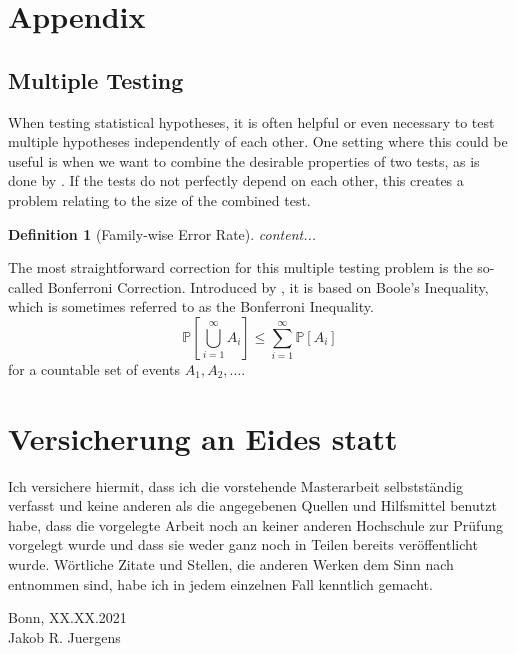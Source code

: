 \documentclass[12pt, a4paper]{article}
\theoremstyle{MAstyle} \newtheorem{assumption}{Assumption}[section]
\theoremstyle{MAstyle} \newtheorem{definition}{Definition}[section]
\begin{document}
	\newpage
	\cleardoublepage
	\setcounter{page}{1}
	\section{Appendix}
	
		\subsection{Multiple Testing}\label{Multiple_Testing}
			When testing statistical hypotheses, it is often helpful or even necessary to test multiple hypotheses independently of each other. One setting where this could be useful is when we want to combine the desirable properties of two tests, as is done by \cite{bugni_permutation_2021}. If the tests do not perfectly depend on each other, this creates a problem relating to the size of the combined test.
			
			\begin{definition}[Family-wise Error Rate]
					content...
				\end{definition}
		
				The most straightforward correction for this multiple testing problem is the so-called Bonferroni Correction. Introduced by \cite{dunn_multiple_1961}, it is based on Boole's Inequality, which is sometimes referred to as the Bonferroni Inequality.
				\begin{equation}
						\mathbb{P}\left[\bigcup_{i = 1}^{\infty} A_i\right] \leq \sum_{i = 1}^{\infty} \mathbb{P}\left[A_i\right]
					\end{equation}
				for a countable set of events $A_1, A_2, \dots$.
	
	\newpage
	\thispagestyle{empty}
	\section*{Versicherung an Eides statt}	
	
		\vspace{3cm}
		
		Ich versichere hiermit, dass ich die vorstehende Masterarbeit
		selbstständig verfasst und keine anderen als die angegebenen Quellen
		und Hilfsmittel benutzt habe, dass die vorgelegte Arbeit noch an keiner
		anderen Hochschule zur Prüfung vorgelegt wurde und dass sie weder
		ganz noch in Teilen bereits veröffentlicht wurde. Wörtliche Zitate und
		Stellen, die anderen Werken dem Sinn nach entnommen sind, habe ich
		in jedem einzelnen Fall kenntlich gemacht.
		
		\vspace{2cm}
		Bonn, XX.XX.2021 \hrulefill \\
		\hspace*{0mm}Jakob R. Juergens
		
		\vspace{\fill}
\end{document}
